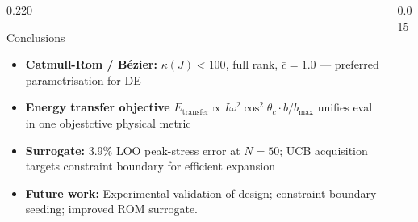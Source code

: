 \documentclass[final]{beamer}
\newcommand{\compactlist}{%
  \setlength{\itemsep}{1pt}\setlength{\parskip}{0pt}%
  \setlength{\topsep}{2pt}\setlength{\leftmargin}{1.2em}}
\begin{document}
\begin{frame}[t]{}
\begin{columns}[t,totalwidth=\paperwidth]
\begin{column}{0.220\paperwidth}
\begin{block}{Conclusions}
\begin{itemize}\compactlist
  \item \textbf{Catmull-Rom / B\'ezier:} $\kappa(J){<}100$, full rank,
        $\bar{c}{=}1.0$ --- preferred parametrisation for DE
  \item \textbf{Energy transfer objective}
        $E_{\text{transfer}}\propto I\omega^2\cos^2\!\theta_c\cdot b/b_{\max}$
        unifies eval in one objestctive physical metric 
  \item \textbf{Surrogate:} 3.9\% LOO peak-stress error at $N{=}50$;
        UCB acquisition targets constraint boundary for efficient expansion
  \item \textbf{Future work:} Experimental validation of design;
        constraint-boundary seeding; improved ROM surrogate. 
\end{itemize}
\end{block}

\end{column}

\begin{column}{0.015\paperwidth}\end{column}
\end{columns}
\end{frame}
\end{document}
